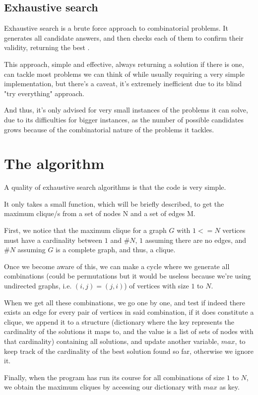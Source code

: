 \documentclass[...]{revdetua}
\begin{document}
\subsection{Exhaustive search}
Exhaustive search is a brute force approach to combinatorial problems.
It generates all candidate answers, and then checks each of them to confirm their validity, returning the best \cite{exh}.\par
This approach, simple and effective, always returning a solution if there is one, can tackle most problems we can think of while usually requiring a very simple implementation, but there's a caveat, it's extremely inefficient due to its blind "try everything" approach.\par And thus, it's only advised for very small instances of the problems it can solve, due to its difficulties for bigger instances, as the number of possible candidates grows because of the combinatorial nature of the problems it tackles.

\section{The algorithm}
A quality of exhaustive search algorithms is that the code is very simple.\par
It only takes a small function, which will be briefly described, to get the maximum clique/s from a set of nodes N and a set of edges M.\par
First, we notice that the maximum clique for a graph $G$ with $1<=N$ vertices must have a cardinality between $1$ and $\#N$, $1$ assuming there are no edges, and $\#N$ assuming $G$ is a complete graph, and thus, a clique.\par
Once we become aware of this, we can make a cycle where we generate all combinations (could be permutations but it would be useless because we're using undirected graphs, i.e. $(i,j)=(j,i)$) of vertices with size $1$ to $N$.\par
When we get all these combinations, we go one by one, and test if indeed there exists an edge for every pair of vertices in said combination, if it does constitute a clique, we append it to a structure (dictionary where the key represents the cardinality of the solutions it maps to, and the value is a list of sets of nodes with that cardinality) containing all solutions, and update another variable, $max$, to keep track of the cardinality of the best solution found so far, otherwise we ignore it.\par
Finally, when the program has run its course for all combinations of size $1$ to $N$, we obtain the maximum cliques by accessing our dictionary with $max$ as key.
	
\end{document}
